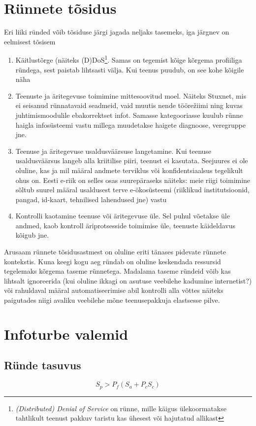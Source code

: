 \documentclass{tufte-book}
\begin{document}
\section{Rünnete tõsidus}
Eri liiki ründed võib tõsiduse järgi jagada neljaks tasemeks, iga järgnev on eelmisest tõsisem

\begin{enumerate}
	\item Käitlustõrge (näiteks (D)DoS\footnote{\emph{(Distributed) Denial of Service} on rünne, mille käigus ülekoormatakse tahtlikult teenust pakkuv taristu kas ühesest või hajutatud allikast}. Samas on tegemist kõige kõrgema profiiliga ründega, sest paistab lihtsasti välja. Kui teenus puudub, on see kohe kõigile näha
	\item Teenuste ja äritegevuse toimimine mittesoovitud moel. Näiteks Stuxnet, mis ei seisanud rünnatavaid seadmeid, vaid muutis nende tööre\v{z}iimi ning kuvas juhtimismoodulile ebakorrektset infot. Samasse kategooriasse kuulub rünne haigla infosüsteemi vastu millega muudetakse haigete diagnoose, veregruppe jne. 
	\item Teenuse ja äritegevuse usaldusväärsuse langetamine. Kui teenuse usaldusväärsus langeb alla kriitilise piiri, teenust ei kasutata. Seejuures ei ole oluline, kas ja mil määral andmete terviklus või konfidentsiaalsus tegelikult ohus on. Eesti e-riik on selles osas suurepäraseks näiteks: meie riigi toimimine sõltub suurel määral usaldusest terve e-ökosüsteemi (riiklikud institutsioonid, pangad, id-kaart, tehnilised lahendused jne) vastu 
	\item Kontrolli kaotamine teenuse või äritegevuse üle. Sel puhul võetakse üle andmed, kaob kontroll äriprotsesside toimimise üle, teenuste käideldavus kõigub jne.
\end{enumerate}

Arusaam rünnete tõsidusastmest on oluline eriti tänases pidevate rünnete kontekstis. Kuna keegi kogu aeg ründab on oluline keskendada ressursid tegelemaks kõrgema taseme rünnetega. Madalama taseme ründeid võib kas lihtsalt ignoreerida (kui oluline ikkagi on asutuse veebilehe kadumine internetist?) või rahuldaval määral automatiseerimise abil kontrolli alla võttes näiteks paigutades niigi avaliku veebilehe mõne teenusepakkuja elastsesse pilve.

\section{Infoturbe valemid} 
\label{sec:valemid}
\subsection{Ründe tasuvus}
\begin{equation}
		S_p>P_f(S_a + P_c S_c)
		\label{eq:tasuvus}
\end{equation}
\end{document}
